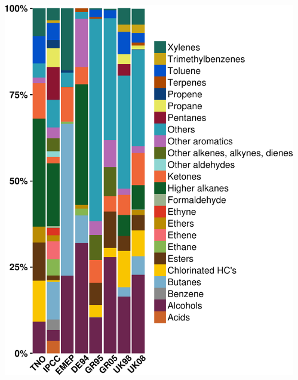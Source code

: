 \begin{frame}
\begin{columns}[onlytextwidth]
\begin{column}{0.45\textwidth}
\begin{flushleft}
            \end{flushleft}
        \end{column}%
        \begin{column}{0.45\textwidth}
            \begin{flushright}
                \vspace{-1.5cm}
                \includegraphics[width=1.10\textwidth]{../Pictures/Speciations_for_MCM} 
            \end{flushright}
        \end{column}
    \end{columns}
\end{frame}

